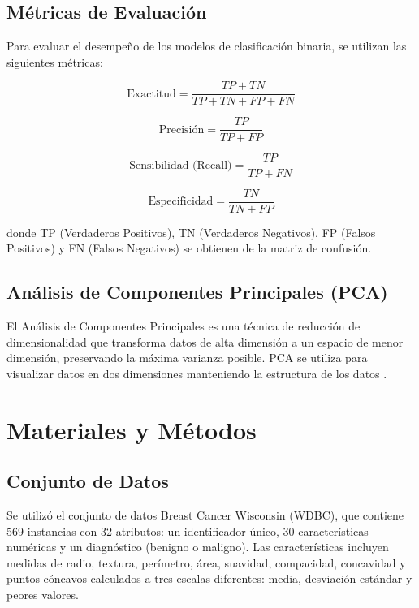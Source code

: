 \documentclass[conference]{IEEEtran}
\begin{document}
\subsection{Métricas de Evaluación}

Para evaluar el desempeño de los modelos de clasificación binaria, se utilizan las siguientes métricas:

\begin{equation}
\text{Exactitud} = \frac{TP + TN}{TP + TN + FP + FN}
\end{equation}

\begin{equation}
\text{Precisión} = \frac{TP}{TP + FP}
\end{equation}

\begin{equation}
\text{Sensibilidad (Recall)} = \frac{TP}{TP + FN}
\end{equation}

\begin{equation}
\text{Especificidad} = \frac{TN}{TN + FP}
\end{equation}

donde TP (Verdaderos Positivos), TN (Verdaderos Negativos), FP (Falsos Positivos) y FN (Falsos Negativos) se obtienen de la matriz de confusión.

\subsection{Análisis de Componentes Principales (PCA)}
El Análisis de Componentes Principales es una técnica de reducción de dimensionalidad que transforma datos de alta dimensión a un espacio de menor dimensión, preservando la máxima varianza posible. PCA se utiliza para visualizar datos en dos dimensiones manteniendo la estructura de los datos \cite{b6}.

\section{Materiales y Métodos}

\subsection{Conjunto de Datos}
Se utilizó el conjunto de datos Breast Cancer Wisconsin (WDBC), que contiene 569 instancias con 32 atributos: un identificador único, 30 características numéricas y un diagnóstico (benigno o maligno). Las características incluyen medidas de radio, textura, perímetro, área, suavidad, compacidad, concavidad y puntos cóncavos calculados a tres escalas diferentes: media, desviación estándar y peores valores.
\end{document}
